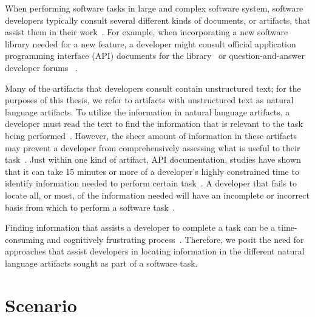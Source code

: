 

When performing software tasks in large and complex software system, software developers typically consult several different kinds of documents, or artifacts, that assist them in their work~\cite{Starke2009, Meyer2017}. For example, 
when incorporating a new software library needed for a new feature, a developer might consult official application programming interface (API) documents for the library~\cite{robillard2011field, umarji2008archetypal} or 
 question-and-answer developer forums 
 ~\cite{parnin2012, silva2019}.



Many of the artifacts that developers consult
contain unstructured text; for the purposes of this thesis, we refer to artifacts with unstructured text as natural language artifacts.  
To utilize the information in  natural language artifacts, a developer must read the text to find the information that is relevant to the task being performed~\cite{Bavota2016}.
However, 
the sheer amount of information in these artifacts may prevent a developer from comprehensively assessing what is useful to their task~\cite{Murphy2005}.
Just within one kind of artifact, API
documentation, studies have shown that it can take 15 minutes or more
of a developer's highly constrained time to identify 
information needed to perform certain task~\cite{endrikat2014, Meyer2017}. 
A developer that fails to locate all, or most, of the information needed
will have an incomplete or incorrect basis from which to perform a software task~\cite{Murphy2005}.



Finding information that assists a developer to complete a task can be a time-consuming
 and cognitively frustrating process~\cite{Begel2008,
 robillard2011field}. Therefore, we posit the need for approaches that assist developers in locating information in the different natural language artifacts sought  as part of a software task.

 
 






 \section{Scenario}
 \label{cp1:example}
 
